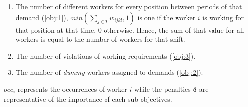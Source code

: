 \documentclass[../../thesis.tex]{subfiles}
\begin{document}
\begin{enumerate}
  \item The number of different workers for every position between periods of that demand (\ref{obj:1}), $min(\sum_{j \in T} w_{ijkl}, 1)$ is one if the worker $i$ is working for that position at that time, 0 otherwise. Hence, the sum of that value for all workers is equal to the number of workers for that shift.
  \item The number of violations of working requirements (\ref{obj:3}).
  \item The number of \emph{dummy} workers assigned to demands (\ref{obj:2}).
\end{enumerate}

$occ_i$ represents the occurrences of worker $i$ while the penalties $\bm{\delta}$ are representative of the importance of each sub-objectives.
\end{document}
